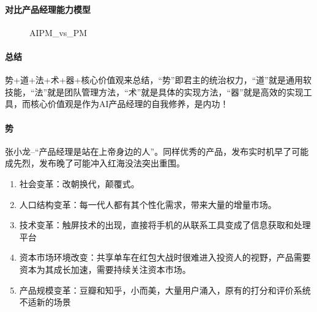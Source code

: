 \documentclass[letterpaper,11pt,english]{sphinxmanual}
\begin{document}
\paragraph{对比产品经理能力模型}
\label{\detokenize{chapter_introduction/ability:id1}}
\begin{figure}[H]
\centering
\capstart

\noindent{}
\caption{AIPM\_vs\_PM}\label{\detokenize{chapter_introduction/ability:id15}}\end{figure}


\paragraph{总结}
\label{\detokenize{chapter_introduction/ability:id2}}
势+道+法+术+器+核心价值观来总结，“势”即君主的统治权力，“道”就是通用软技能，“法”就是团队管理方法，“术”就是具体的实现方法，“器”就是高效的实现工具，而核心价值观是作为AI产品经理的自我修养，是内功！


\paragraph{势}
\label{\detokenize{chapter_introduction/ability:id3}}
张小龙–“产品经理是站在上帝身边的人”。同样优秀的产品，发布实时机早了可能成先烈，发布晚了可能冲入红海没法突出重围。
\begin{enumerate}
%
\item {} 
社会变革：改朝换代，颠覆式。

\item {} 
人口结构变革：每一代人都有其个性化需求，带来大量的增量市场。

\item {} 
技术变革：触屏技术的出现，直接将手机的从联系工具变成了信息获取和处理平台

\item {} 
资本市场环境改变：共享单车在红包大战时很难进入投资人的视野，产品需要资本为其成长加速，需要持续关注资本市场。

\item {} 
产品规模变革：豆瓣和知乎，小而美，大量用户涌入，原有的打分和评价系统不适新的场景

\end{enumerate}
\end{document}
